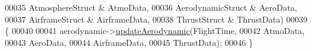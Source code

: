 \begin{DoxyCode}
00035                                     AtmosphereStruct & AtmoData, 
00036                                     AerodynamicStruct & AeroData, 
00037                                     AirframeStruct & AirframeData, 
00038                                     ThrustStruct & ThrustData)
00039 \{
00040 
00041     aerodynamic->\hyperlink{group___aerodynamic_a6354f3c8433c7a2235041f843d4fe10e}{updateAerodynamic}(FlightTime,
00042                                     AtmoData,
00043                                     AeroData,
00044                                     AirframeData,
00045                                     ThrustData);
00046 \}
\end{DoxyCode}
